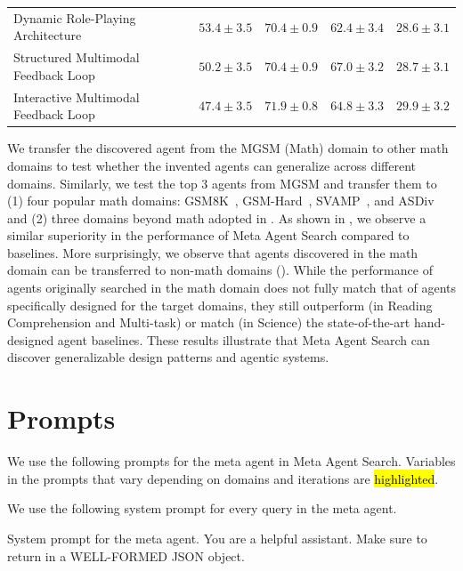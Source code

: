 \documentclass{article}
\newcommand{\ouralgo}{Meta Agent Search\xspace}
\begin{document}
\begin{table}[h]
{\begin{tabular}{>{\raggedright}p{7cm}c|ccc}
        Dynamic Role-Playing Architecture & \rule{0pt}{2.2ex}$\mathbf{53.4 \pm 3.5}$ & $70.4 \pm 0.9$ & $62.4 \pm 3.4$ & $28.6 \pm 3.1$ \\
        Structured Multimodal Feedback Loop & \rule{0pt}{2.2ex}$50.2 \pm 3.5$ & $70.4 \pm 0.9$ & $\mathbf{67.0 \pm 3.2}$ & $28.7 \pm 3.1$  \\
        Interactive Multimodal Feedback Loop & \rule{0pt}{2.2ex}$47.4 \pm 3.5$ & $\mathbf{71.9\pm0.8}$ & $64.8 \pm 3.3$ & $\mathbf{29.9 \pm 3.2}$ \\
        \bottomrule
    \end{tabular}}
    \label{tab:transfer_other_domians}
\end{table}

We transfer the discovered agent from the MGSM (Math) domain to other math domains to test whether the invented agents can generalize across different domains.
Similarly, we test the top 3 agents from MGSM and transfer them to (1) four popular math domains: GSM8K~\citep{cobbe2021gsm8k}, GSM-Hard~\citep{gao2023gsmhard}, SVAMP~\citep{patel2021SVAMP}, and ASDiv~\citep{miao-2020-asdiv} and (2) three domains beyond math adopted in . As shown in , we observe a similar superiority in the performance of \ouralgo compared to baselines. More surprisingly, we observe that agents discovered in the math domain can be transferred to non-math domains (). While the performance of agents originally searched in the math domain does not fully match that of agents specifically designed for the target domains, they still outperform (in Reading Comprehension and Multi-task) or match (in Science) the state-of-the-art hand-designed agent baselines. These results illustrate that \ouralgo can discover generalizable design patterns and agentic systems.

\section{Prompts}
\label{append_section:prompt}

We use the following prompts for the meta agent in \ouralgo. Variables in the prompts that vary depending on domains and iterations are \hl{highlighted}.

We use the following system prompt for every query in the meta agent.
\begin{mybox}{System prompt for the meta agent.}
\small
You are a helpful assistant. Make sure to return in a WELL-FORMED JSON object.
\end{mybox}
\end{document}
